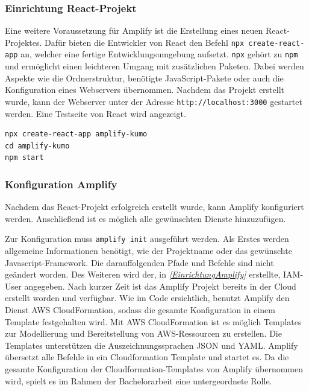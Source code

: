 \subsubsection{Einrichtung React-Projekt}

Eine weitere Voraussetzung für Amplify ist die Erstellung eines neuen React-Projektes.
Dafür bieten die Entwickler von React den Befehl \verb+npx create-react-app+ an, welcher eine fertige Entwicklungsumgebung aufsetzt.
\verb+npx+ gehört zu \verb+npm+ und ermöglicht einen leichteren Umgang mit zusätzlichen Paketen.
Dabei werden Aspekte wie die Ordnerstruktur, benötigte JavaScript-Pakete oder auch die Konfiguration eines Webservers übernommen.\cite{ReactNew}
Nachdem das Projekt erstellt wurde, kann der Webserver unter der Adresse \verb+http://localhost:3000+ gestartet werden.
Eine Testseite von React wird angezeigt.
\\
\begin{lstlisting}[basicstyle=\ttfamily\small, breaklines=true , frame = single, backgroundcolor=\color{flashwhite} ]
npx create-react-app amplify-kumo
cd amplify-kumo
npm start
\end{lstlisting}


\subsubsection{Konfiguration Amplify}

Nachdem das React-Projekt erfolgreich erstellt wurde, kann Amplify konfiguriert werden.
Anschließend ist es möglich alle gewünschten Dienste hinzuzufügen.

Zur Konfiguration muss \verb+amplify init+ ausgeführt werden.
Als Erstes werden allgemeine Informationen benötigt, wie der Projektname oder das gewünschte Javascript-Framework.
Die darauffolgenden Pfade und Befehle sind nicht geändert worden.
Des Weiteren wird der, in \textit{\ref{EinrichtungAmplify} } erstellte, IAM-User angegeben.
Nach kurzer Zeit ist das Amplify Projekt bereits in der Cloud erstellt worden und verfügbar.
\clearpage
Wie im Code ersichtlich, benutzt Amplify den Dienst AWS CloudFormation, sodass die gesamte Konfiguration in einem Template festgehalten wird.
Mit AWS CloudFormation ist es möglich Templates zur Modellierung und Bereitstellung von AWS-Ressourcen zu erstellen.
Die Templates unterstützen die Auszeichnungssprachen JSON und YAML.
Amplify übersetzt alle Befehle in ein Cloudformation Template und startet es.
Da die gesamte Konfiguration der Cloudformation-Templates von Amplify übernommen wird, spielt es im Rahmen der Bachelorarbeit eine untergeordnete Rolle.

